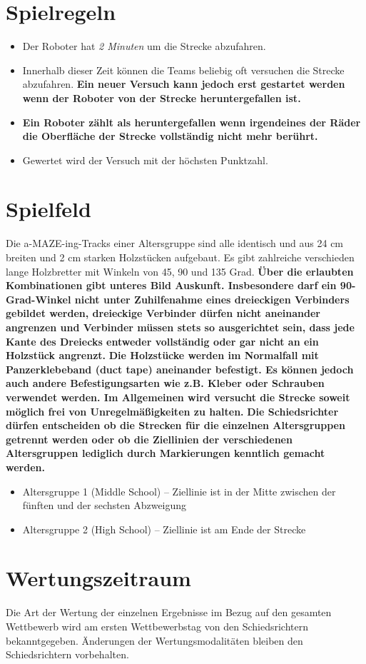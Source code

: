 \documentclass[a4paper,12pt]{article}
\begin{document}
\section{Spielregeln}
\begin{itemize}
\item Der Roboter hat \emph{2 Minuten} um die Strecke abzufahren.
\item Innerhalb dieser Zeit können die Teams beliebig oft versuchen die Strecke abzufahren.
\textbf{Ein neuer Versuch kann jedoch erst gestartet werden wenn der Roboter von der Strecke
heruntergefallen ist.}
\item \textbf{Ein Roboter zählt als heruntergefallen wenn irgendeines der Räder die Oberfläche der Strecke
vollständig nicht mehr berührt.}
\item Gewertet wird der Versuch mit der höchsten Punktzahl.
\end{itemize}
\section{Spielfeld}
Die a-MAZE-ing-Tracks einer Altersgruppe sind alle identisch und aus 24 cm breiten und 2 cm starken
Holzstücken aufgebaut. Es gibt zahlreiche verschieden lange Holzbretter mit Winkeln von 45, 90 und 135
Grad. \textbf{Über die erlaubten Kombinationen gibt unteres Bild Auskunft. Insbesondere darf ein
90-Grad-Winkel nicht unter Zuhilfenahme eines dreieckigen Verbinders gebildet werden, dreieckige 
Verbinder dürfen nicht aneinander angrenzen und Verbinder müssen stets so ausgerichtet sein, dass
jede Kante des Dreiecks entweder vollständig oder gar nicht an ein Holzstück angrenzt.}
\textbf{Die Holzstücke werden im Normalfall mit Panzerklebeband (duct tape) aneinander befestigt.
Es können jedoch auch andere Befestigungsarten wie z.B. Kleber oder Schrauben verwendet werden.
Im Allgemeinen wird versucht die Strecke soweit möglich frei von Unregelmäßigkeiten zu halten.}
\textbf{Die Schiedsrichter dürfen entscheiden ob die Strecken für die einzelnen Altersgruppen
getrennt werden oder ob die Ziellinien der verschiedenen Altersgruppen lediglich durch Markierungen
kenntlich gemacht werden.}
\begin{itemize}
\item Altersgruppe 1 (Middle School) – Ziellinie ist in der Mitte zwischen der fünften und der sechsten Abzweigung
\item Altersgruppe 2 (High School) – Ziellinie ist am Ende der Strecke
\end{itemize}
\section{Wertungszeitraum}
\par Die Art der Wertung der einzelnen Ergebnisse im Bezug auf den gesamten Wettbewerb wird am ersten Wettbewerbstag von den Schiedsrichtern bekanntgegeben. Änderungen der Wertungsmodalitäten bleiben den Schiedsrichtern vorbehalten.
\end{document}
